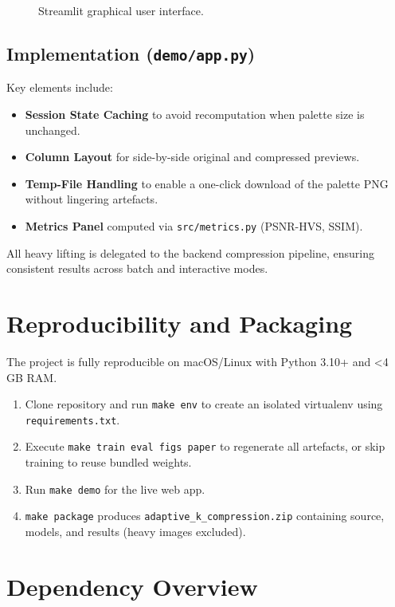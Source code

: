 \documentclass[11pt]{article}
\begin{document}
\begin{figure}[H]
  \centering
  \caption{Streamlit graphical user interface.}
  \label{fig:ui}
\end{figure}

\subsection{Implementation (\texttt{demo/app.py})}
Key elements include:
\begin{itemize}
  \item \textbf{Session State Caching} to avoid recomputation when palette size is unchanged.
  \item \textbf{Column Layout} for side-by-side original and compressed previews.
  \item \textbf{Temp-File Handling} to enable a one-click download of the palette PNG without lingering artefacts.
  \item \textbf{Metrics Panel} computed via \texttt{src/metrics.py} (PSNR-HVS, SSIM).
\end{itemize}
All heavy lifting is delegated to the backend compression pipeline, ensuring consistent results across batch and interactive modes.

\section{Reproducibility and Packaging}
The project is fully reproducible on macOS/Linux with Python 3.10+ and \textless4 GB RAM.
\begin{enumerate}
  \item Clone repository and run \texttt{make env} to create an isolated virtualenv using \texttt{requirements.txt}.
  \item Execute \texttt{make train eval figs paper} to regenerate all artefacts, or skip training to reuse bundled weights.
  \item Run \texttt{make demo} for the live web app.
  \item \texttt{make package} produces \texttt{adaptive\_k\_compression.zip} containing source, models, and results (heavy images excluded).
\end{enumerate}

\section{Dependency Overview}
\end{document}
